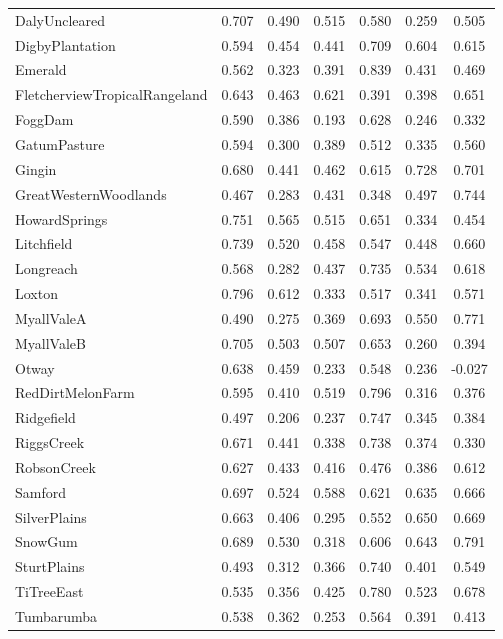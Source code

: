 \documentclass[11pt,a4paper]{article}
\begin{document}
\begin{longtable}{lcccccc}
  DalyUncleared & 0.707 & 0.490 & 0.515 & 0.580 & 0.259 & 0.505 \\
  DigbyPlantation & 0.594 & 0.454 & 0.441 & 0.709 & 0.604 & 0.615 \\
  Emerald & 0.562 & 0.323 & 0.391 & 0.839 & 0.431 & 0.469 \\
  FletcherviewTropicalRangeland & 0.643 & 0.463 & 0.621 & 0.391 & 0.398 & 0.651 \\
  FoggDam & 0.590 & 0.386 & 0.193 & 0.628 & 0.246 & 0.332 \\
  GatumPasture & 0.594 & 0.300 & 0.389 & 0.512 & 0.335 & 0.560 \\
  Gingin & 0.680 & 0.441 & 0.462 & 0.615 & 0.728 & 0.701 \\
  GreatWesternWoodlands & 0.467 & 0.283 & 0.431 & 0.348 & 0.497 & 0.744 \\
  HowardSprings & 0.751 & 0.565 & 0.515 & 0.651 & 0.334 & 0.454 \\
  Litchfield & 0.739 & 0.520 & 0.458 & 0.547 & 0.448 & 0.660 \\
  Longreach & 0.568 & 0.282 & 0.437 & 0.735 & 0.534 & 0.618 \\
  Loxton & 0.796 & 0.612 & 0.333 & 0.517 & 0.341 & 0.571 \\
  MyallValeA & 0.490 & 0.275 & 0.369 & 0.693 & 0.550 & 0.771 \\
  MyallValeB & 0.705 & 0.503 & 0.507 & 0.653 & 0.260 & 0.394 \\
  Otway & 0.638 & 0.459 & 0.233 & 0.548 & 0.236 & -0.027 \\
  RedDirtMelonFarm & 0.595 & 0.410 & 0.519 & 0.796 & 0.316 & 0.376 \\
  Ridgefield & 0.497 & 0.206 & 0.237 & 0.747 & 0.345 & 0.384 \\
  RiggsCreek & 0.671 & 0.441 & 0.338 & 0.738 & 0.374 & 0.330 \\
  RobsonCreek & 0.627 & 0.433 & 0.416 & 0.476 & 0.386 & 0.612 \\
  Samford & 0.697 & 0.524 & 0.588 & 0.621 & 0.635 & 0.666 \\
  SilverPlains & 0.663 & 0.406 & 0.295 & 0.552 & 0.650 & 0.669 \\
  SnowGum & 0.689 & 0.530 & 0.318 & 0.606 & 0.643 & 0.791 \\
  SturtPlains & 0.493 & 0.312 & 0.366 & 0.740 & 0.401 & 0.549 \\
  TiTreeEast & 0.535 & 0.356 & 0.425 & 0.780 & 0.523 & 0.678 \\
  Tumbarumba & 0.538 & 0.362 & 0.253 & 0.564 & 0.391 & 0.413 \\

\end{longtable}
\end{document}
